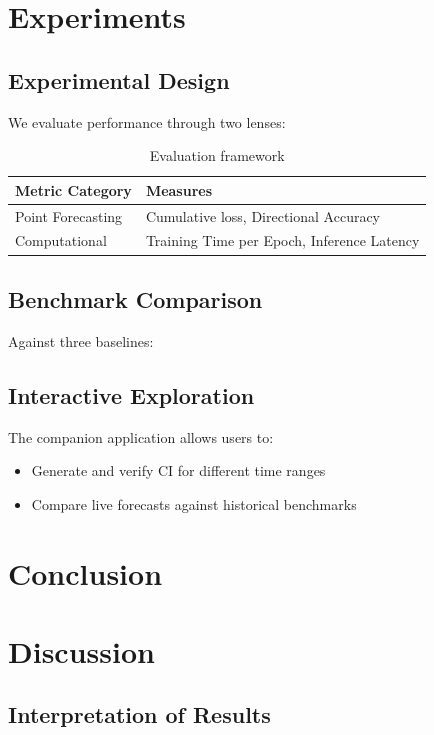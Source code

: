 \documentclass[12pt]{article}
\begin{document}
\section{Experiments}
\label{sec:experiments}

\subsection{Experimental Design}
We evaluate performance through two lenses:

\begin{table}[h]
\centering
\caption{Evaluation framework}
\label{tab:eval}
\begin{tabular}{ll}
\toprule
\textbf{Metric Category} & \textbf{Measures} \\
\midrule
Point Forecasting & Cumulative loss, Directional Accuracy \\
Computational & Training Time per Epoch, Inference Latency \\
\bottomrule
\end{tabular}
\end{table}

\subsection{Benchmark Comparison}
Against three baselines:

\subsection{Interactive Exploration}
The companion application allows users to:
\begin{itemize}
\item Generate and verify CI for different time ranges
\item Compare live forecasts against historical benchmarks
\end{itemize}

\section{Conclusion}
\label{sec:conclusions}

\section{Discussion}
\label{sec:discussion}

\subsection{Interpretation of Results}
\end{document}
